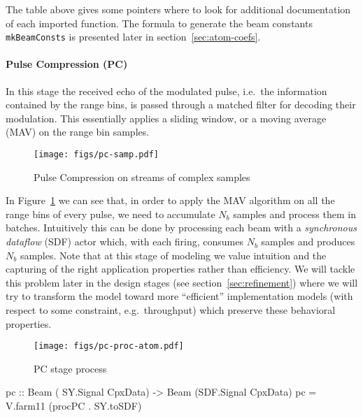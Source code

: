 \documentclass[
  a4paper,
]{article}
\newenvironment{Shaded}{}{}
\newcommand{\DataTypeTok}[1]{\textcolor[rgb]{0.56,0.13,0.00}{#1}}
\newcommand{\FunctionTok}[1]{\textcolor[rgb]{0.02,0.16,0.49}{#1}}
\newcommand{\NormalTok}[1]{#1}
\newcommand{\OtherTok}[1]{\textcolor[rgb]{0.00,0.44,0.13}{#1}}
\let\oldparagraph\paragraph
\renewcommand{\paragraph}[1]{\oldparagraph{#1}\mbox{}}
\begin{document}
The table above gives some pointers where to look for additional
documentation of each imported function. The formula to generate the
beam constants \texttt{mkBeamConsts} is presented later in
section~\ref{sec:atom-coefs}.

\hypertarget{sec:pc-atom}{%
\paragraph{Pulse Compression (PC)}\label{sec:pc-atom}}

In this stage the received echo of the modulated pulse, i.e.~the
information contained by the range bins, is passed through a matched
filter for decoding their modulation. This essentially applies a sliding
window, or a moving average (MAV) on the range bin samples.

\begin{figure}
\hypertarget{fig:pc-samp}{%
\centering
\texttt{[image: figs/pc-samp.pdf]}
\caption{Pulse Compression on streams of complex
samples}\label{fig:pc-samp}
}
\end{figure}

In Figure~\ref{fig:pc-samp} we can see that, in order to apply the MAV
algorithm on all the range bins of every pulse, we need to accumulate
\(N_b\) samples and process them in batches. Intuitively this can be
done by processing each beam with a \emph{synchronous dataflow} (SDF)
actor which, with each firing, consumes \(N_b\) samples and produces
\(N_b\) samples. Note that at this stage of modeling we value intuition
and the capturing of the right application properties rather than
efficiency. We will tackle this problem later in the design stages (see
section~\ref{sec:refinement}) where we will try to transform the model
toward more ``efficient'' implementation models (with respect to some
constraint, e.g.~throughput) which preserve these behavioral properties.

\begin{figure}
\hypertarget{fig:pc-proc-atom}{%
\centering
\texttt{[image: figs/pc-proc-atom.pdf]}
\caption{PC stage process}\label{fig:pc-proc-atom}
}
\end{figure}

\begin{Shaded}
\begin{Highlighting}[numbers=left,,firstnumber=215,]
\OtherTok{pc ::} \DataTypeTok{Beam}\NormalTok{ ( }\DataTypeTok{SY.Signal} \DataTypeTok{CpxData}\NormalTok{)}
   \OtherTok{->} \DataTypeTok{Beam}\NormalTok{ (}\DataTypeTok{SDF.Signal} \DataTypeTok{CpxData}\NormalTok{)}
\NormalTok{pc }\FunctionTok{=}\NormalTok{ V.farm11 (procPC }\FunctionTok{.}\NormalTok{ SY.toSDF)}
\end{Highlighting}
\end{Shaded}
\end{document}
